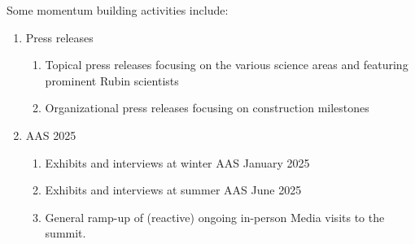Some momentum building activities include:
\begin{enumerate}
\item Press releases
\begin{enumerate}
\item Topical press releases focusing on the various science areas and featuring prominent Rubin scientists
\item Organizational press releases focusing on construction milestones
\end{enumerate}
\item AAS 2025
\begin{enumerate}
\item Exhibits and interviews at winter AAS January 2025
\item Exhibits and interviews at summer AAS June 2025
\item General ramp-up of (reactive) ongoing in-person Media visits to the summit.
\end{enumerate}
\end{enumerate}



